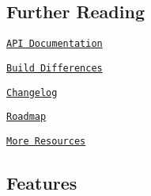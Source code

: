 \subsection*{Further Reading}


\begin{DoxyItemize}
\item \href{https://lodash.com/docs}{\tt A\+P\+I Documentation}
\item \href{https://github.com/lodash/lodash/wiki/Build-Differences}{\tt Build Differences}
\item \href{https://github.com/lodash/lodash/wiki/Changelog}{\tt Changelog}
\item \href{https://github.com/lodash/lodash/wiki/Roadmap}{\tt Roadmap}
\item \href{https://github.com/lodash/lodash/wiki/Resources}{\tt More Resources}
\end{DoxyItemize}

\subsection*{Features}


